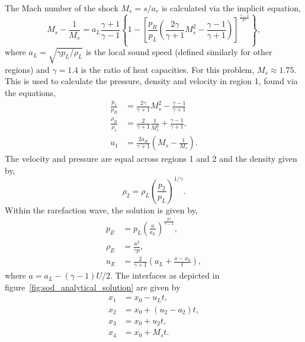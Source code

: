 The Mach number of the shock $M_s = s/a_r$ is calculated via the implicit equation,
\begin{equation}
  \label{eq:mach_shock}
M_s - \frac{1}{M_s} = a_L \frac{\gamma + 1}{\gamma - 1} \left\{
1 - \left[
\frac{p_R}{p_L} \left(
\frac{2\gamma}{\gamma +1}M_s^2 - \frac{\gamma - 1}{\gamma +1} 
\right)
\right]^{\frac{\gamma - 1}{2\gamma}}
\right\},
\end{equation}
where $a_L = \sqrt{\gamma p_L / \rho_L}$ is the local sound speed (defined similarly for other regions) and $\gamma = 1.4$ is the ratio of heat capacities. For this problem, $M_s \approx 1.75$. This is used to calculate the pressure, density and velocity in region 1, found via the equations,
\begin{equation}
  \label{eq:sod_region1}
\begin{aligned}
\frac{p_1}{p_R} &= \frac{2\gamma}{\gamma + 1} M_s^2 - \frac{\gamma -1}{\gamma +1}\\
\frac{\rho_R}{\rho_1} &= \frac{2}{\gamma + 1} \frac{1}{M_s^2} + \frac{\gamma -1}{\gamma + 1},\\
u_1 &= \frac{2a_R}{\gamma + 1} \left( M_s - \frac{1}{M_s} \right).
\end{aligned}
\end{equation}
The velocity and pressure are equal across regions 1 and 2 and the density given by,
\begin{equation}
  \label{eq:sod_region2}
\rho_2 = \rho_L \left( \frac{p_2}{p_L} \right)^{1/\gamma}.
\end{equation}
Within the rarefaction wave, the solution is given by,
\begin{equation}
  \label{eq:sod_regionE}
  \begin{aligned}
  p_E &= p_L \left( \frac{a}{a_L} \right)^{\frac{2\gamma}{\gamma-1}},\\
  \rho_E &= \frac{a^2}{\gamma p},\\
  u_E &= \frac{2}{\gamma +1} \left(a_L + \frac{x - x_0}{t}\right),
  \end{aligned}
\end{equation}
where $a = a_L - (\gamma-1)U/2$. The interfaces as depicted in figure~\ref{fig:sod_analytical_solution} are given by
\begin{equation}
  \label{eq:sod_interfaces}
\begin{aligned}
x_1 &= x_0 - u_L t,\\
x_2 &= x_0 + (u_2 - a_2)t, \\
x_3 &= x_0 + u_2 t, \\
x_4 &= x_0 + M_s t.
\end{aligned}
\end{equation}


